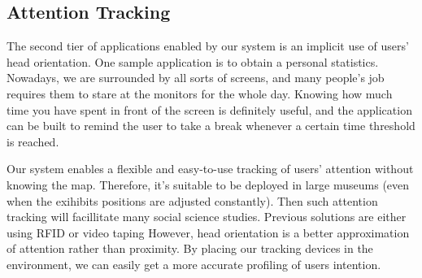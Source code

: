 
\subsection{Attention Tracking}
\label{sec:attention-tracking}

The second tier of applications enabled by our system is an implicit use of users' head orientation. One sample application is to obtain a personal statistics. Nowadays, we are surrounded by all sorts of screens, and many people's job requires them to stare at the monitors for the whole day. 
Knowing how much time you have spent in front of the screen is definitely useful, and the application can be built to remind the user to take a break whenever a certain time threshold is reached.

Our system enables a flexible and easy-to-use tracking of users' attention without knowing the map. Therefore, it's suitable to be deployed in large museums (even when the exihibits positions are adjusted constantly). Then such attention tracking will facillitate many social science studies. Previous solutions are either using RFID \cite{Hsi:2005:REV:1081992.1082021} or video taping %
However, head orientation is a better approximation of attention rather than proximity. By placing our tracking devices in the environment, we can easily get a more accurate profiling of users intention.

